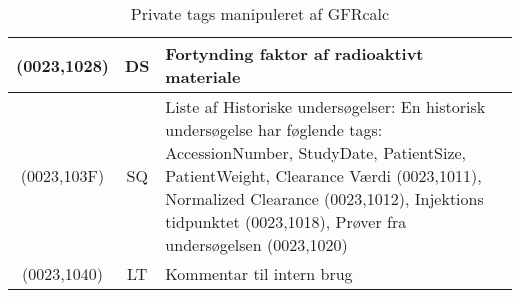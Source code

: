 \documentclass{article}
\begin{document}
\begin{table}[h]
\begin{center}
\begin{tabular}{|c|c|p{7cm}|}
		(0023,1028) & DS & Fortynding faktor af radioaktivt materiale \\ \hline
		(0023,103F) & SQ & Liste af Historiske undersøgelser: En historisk undersøgelse har føglende tags: AccessionNumber, StudyDate, PatientSize, PatientWeight, Clearance Værdi (0023,1011), Normalized Clearance (0023,1012),  Injektions tidpunktet (0023,1018), Prøver fra undersøgelsen (0023,1020) \\ \hline
		(0023,1040) & LT & Kommentar til intern brug  \\ \hline
		\end{tabular}
	\end{center}
	\caption{Private tags manipuleret af GFRcalc}
\end{table}
\end{document}
